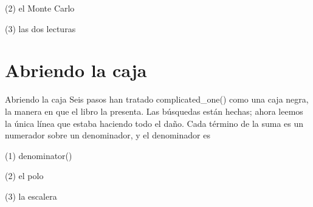\begin{frame}[fragile]{(2) el Monte Carlo}

\end{frame}

\begin{frame}[fragile]{(3) las dos lecturas}

\end{frame}


\section{Abriendo la caja}

\begin{frame}{Abriendo la caja}
Seis pasos han tratado complicated\_one() como una caja negra, la manera en que el libro
la presenta. Las búsquedas están hechas; ahora leemos la única línea que estaba haciendo
todo el daño. Cada término de la suma es un numerador sobre un denominador, y
el denominador es
\end{frame}

\begin{frame}[fragile]{(1) denominator()}

\end{frame}

\begin{frame}[fragile]{(2) el polo}

\end{frame}

\begin{frame}[fragile]{(3) la escalera}

\end{frame}


